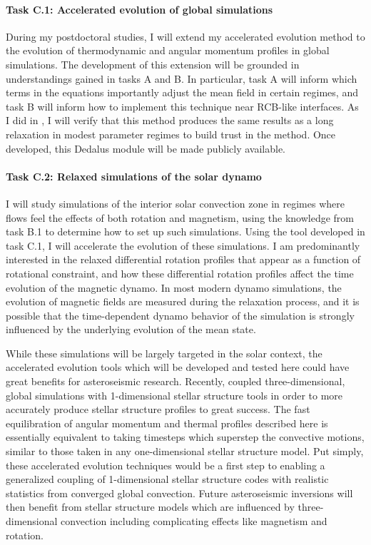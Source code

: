 \documentclass[aasms,11pt, longbibliography]{article}
\begin{document}
\paragraph{Task C.1: Accelerated evolution of global simulations}
\label{sct:taskC1}
During my postdoctoral studies, I will extend my accelerated evolution method to the evolution of thermodynamic and angular momentum profiles in global simulations.
The development of this extension will be grounded in understandings gained in tasks A and B.
In particular, task A will inform which terms in the equations importantly adjust the mean field in certain regimes, and task B will inform how to implement this technique near RCB-like interfaces.
As I did in \citet{anders&all2018}, I will verify that this method produces the same results as a long relaxation in modest parameter regimes to build trust in the method.
Once developed, this Dedalus module will be made publicly available.

\paragraph{Task C.2: Relaxed simulations of the solar dynamo}
\label{sct:taskC2}
I will study simulations of the interior solar convection zone in regimes where flows feel the effects of both rotation and magnetism, using the knowledge from task B.1 to determine how to set up such simulations.
Using the tool developed in task C.1, I will accelerate the evolution of these simulations.
I am predominantly interested in the relaxed differential rotation profiles that appear as a function of rotational constraint, and how these differential rotation profiles affect the time evolution of the magnetic dynamo.
In most modern dynamo simulations, the evolution of magnetic fields are measured during the relaxation process, and it is possible that the time-dependent dynamo behavior of the simulation is strongly influenced by the underlying evolution of the mean state.

While these simulations will be largely targeted in the solar context, the accelerated evolution tools which will be developed and tested here could have great benefits for asteroseismic research.
Recently, \citet{jorgensen&weiss2019} coupled three-dimensional, global simulations with 1-dimensional stellar structure tools in order to more accurately produce stellar structure profiles to great success.
The fast equilibration of angular momentum and thermal profiles described here is essentially equivalent to taking timesteps which superstep the convective motions, similar to those taken in any one-dimensional stellar structure model.
Put simply, these accelerated evolution techniques would be a first step to enabling a generalized coupling of 1-dimensional stellar structure codes with realistic statistics from converged global convection.
Future asteroseismic inversions will then benefit from stellar structure models which are influenced by three-dimensional convection including complicating effects like magnetism and rotation.
\end{document}
